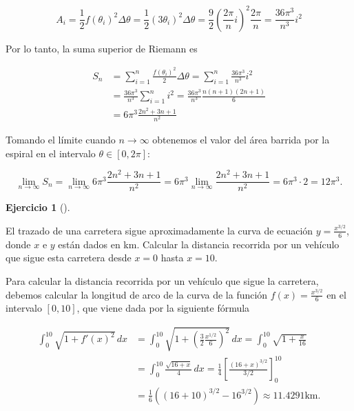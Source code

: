 \documentclass[
  spanish,
  a4paper,
]{scrreport}
\theoremstyle{definition}
\newtheorem{exercise}{Ejercicio}[chapter]
\theoremstyle{remark}
\begin{document}
\begin{tcolorbox}
\[
A_i 
= \frac{1}{2}f(\theta_i)^2\Delta \theta
= \frac{1}{2}(3\theta_i)^2\Delta \theta
= \frac{9}{2} \left(\frac{2\pi}{n}i\right)^2 \frac{2\pi}{n}
= \frac{36\pi^3}{n^3}i^2
\]

Por lo tanto, la suma superior de Riemann es

\begin{align*}
S_n 
&= \sum_{i=1}^n \frac{f(\theta_i)^2}{2}\Delta \theta 
= \sum_{i=1}^n \frac{36\pi^3}{n^3}i^2 \\
&= \frac{36\pi^3}{n^3} \sum_{i=1}^n i^2
=  \frac{36\pi^3}{n^3} \frac{n(n+1)(2n+1)}{6} \\
&= 6\pi^3  \frac{2n^2+3n+1}{n^2} 
\end{align*}

Tomando el límite cuando \(n \to \infty\) obtenemos el valor del área
barrida por la espiral en el intervalo \(\theta \in [0, 2\pi]\):

\[
\lim_{n \to \infty} S_n
= \lim_{n \to \infty} 6\pi^3  \frac{2n^2+3n+1}{n^2}
= 6\pi^3 \lim_{n \to \infty} \frac{2n^2+3n+1}{n^2}
= 6\pi^3\cdot 2
= 12\pi^3.
\]

\end{tcolorbox}

\begin{exercise}[]\protect\hypertarget{exr-2}{}\label{exr-2}

El trazado de una carretera sigue aproximadamente la curva de ecuación
\(y=\frac{x^{3/2}}{6}\), donde \(x\) e \(y\) están dados en km. Calcular
la distancia recorrida por un vehículo que sigue esta carretera desde
\(x=0\) hasta \(x=10\).

\end{exercise}

\begin{tcolorbox}[enhanced jigsaw, colbacktitle=quarto-callout-tip-color!10!white, opacityback=0, toptitle=1mm, title=\textcolor{quarto-callout-tip-color}{\faLightbulb}\hspace{0.5em}{Solución}, coltitle=black, opacitybacktitle=0.6, breakable, toprule=.15mm, leftrule=.75mm, titlerule=0mm, colframe=quarto-callout-tip-color-frame, left=2mm, bottomrule=.15mm, bottomtitle=1mm, arc=.35mm, rightrule=.15mm, colback=white]

Para calcular la distancia recorrida por un vehículo que sigue la
carretera, debemos calcular la longitud de arco de la curva de la
función \(f(x)=\frac{x^{3/2}}{6}\) en el intervalo \([0,10]\), que viene
dada por la siguiente fórmula

\begin{align*}
\int_0^{10}  \sqrt{1+f'(x)^2}\,dx 
&= \int_0^{10} \sqrt{1+\left(\frac{3}{2}\frac{x^{1/2}}{6}\right)^2}\,dx
= \int_0^{10} \sqrt{1+\frac{x}{16}} \\
&= \int_0^{10} \frac{\sqrt{16+x}}{4}\,dx
= \frac{1}{4}\left[\frac{(16+x)^{3/2}}{3/2}\right]_0^{10} \\
&= \frac{1}{6}\left((16+10)^{3/2}-16^{3/2}\right)
\approx 11.4291 \mbox{km}.
\end{align*}

\end{tcolorbox}
\end{document}

